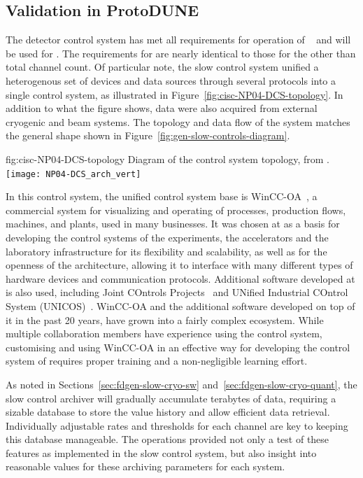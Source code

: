 \subsection{Validation in ProtoDUNE}
\label{sec:cisc-slow-control-pdsp}

The  detector control system has met
all requirements for operation of ~\cite{pdspdcs_proc} and will be used for . The requirements for  are
nearly identical to those for the  other than
total channel count. Of particular note, the  slow control system unified a heterogenous set of devices and data sources
through several protocols into a
single control system, as illustrated in
Figure~\ref{fig:cisc-NP04-DCS-topology}. In addition to what
the figure shows, data were also acquired from external cryogenic and beam
systems.  The topology and data flow of the system matches the general
shape shown in Figure~\ref{fig:gen-slow-controls-diagram}.

\begin{dunefigure}{fig:cisc-NP04-DCS-topology}
{Diagram of the  control system topology, from \cite{pdspdcs_proc}.}
\texttt{[image: NP04-DCS\_arch\_vert]}
\end{dunefigure}

In this control system, the unified control system base is WinCC-OA~\cite{winccoa}, a commercial  system for visualizing and operating of processes, production flows, machines, and plants, used
in many businesses. It was chosen at  as a basis for
developing the control systems of the  experiments, the
accelerators and the laboratory infrastructure for its flexibility and
scalability, as well as for the openness of the architecture, allowing
it to interface with many different types of hardware devices and
communication protocols. Additional software developed at 
is also used, including Joint COntrols Projects~\cite{jcop} and UNified
Industrial COntrol System (UNICOS)~\cite{unicos}. WinCC-OA and the
additional software developed on top of it in the past 20 years, have
grown into a fairly complex ecosystem. While multiple collaboration
members have experience using the  control system,
customising and using WinCC-OA in an effective way for developing the
control system of  requires proper training and a
non-negligible learning effort.

As noted in Sections~\ref{sec:fdgen-slow-cryo-sw} and~\ref{sec:fdgen-slow-cryo-quant},
the slow control archiver will gradually accumulate terabytes of
data, requiring a sizable database to store the value history and
allow efficient data retrieval. Individually adjustable rates and
thresholds for each channel are key to keeping this database
manageable. The  operations provided not only a test of
these features as implemented in the  slow control system, but also insight into
reasonable values for these archiving parameters for each system.


